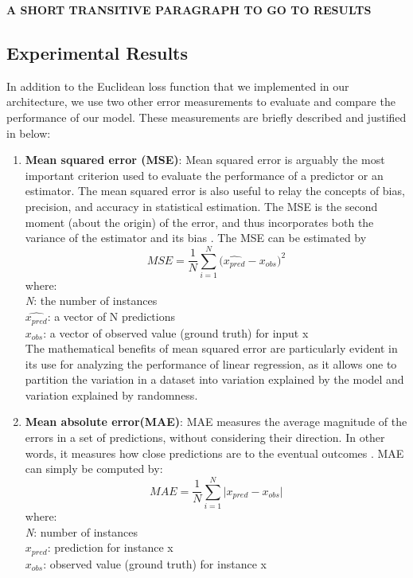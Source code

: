  

\textbf{A SHORT TRANSITIVE PARAGRAPH TO GO TO RESULTS}

\subsection{Experimental Results}

In addition to the Euclidean loss function that we implemented in our architecture, we use two other error measurements to evaluate and compare the performance of our model. These measurements are briefly described and justified in below:
\begin{enumerate}
\item \textbf{Mean squared error (MSE)}: Mean squared error is arguably the most important criterion used to evaluate the performance of a predictor or an estimator. The mean squared error is also useful to relay the concepts of bias, precision, and accuracy in statistical estimation. The MSE is the second moment (about the origin) of the error, and thus incorporates both the variance of the estimator and its bias \cite{lehmann1998theory}. The MSE can be estimated by
$$MSE = {\frac{1} {N}{\sum\limits_{i = 1}^N {(\hat{x_{pred}} - x_{obs} } })^{2} } $$
where:\\
\textit{N}: the number of instances\\
\textit{ $\hat{x_{pred}}$}: a vector of N predictions\\
\textit{$x_{obs}$}: a vector of observed value (ground truth) for input x\\

The mathematical benefits of mean squared error are particularly evident in its use for analyzing the performance of linear regression, as it allows one to partition the variation in a dataset into variation explained by the model and variation explained by randomness.
\item \textbf{Mean absolute error(MAE)}: MAE measures the average magnitude of the errors in a set of predictions, without considering their direction. In other words, it measures how close predictions are to the eventual outcomes \cite{willmott2005advantages}. MAE can simply be computed by:
$$MAE = {\frac{1} {N}{\sum\limits_{i = 1}^N {|x_{pred} - x_{obs} } }| } $$
where:\\
\textit{N}: number of instances\\
\textit{ $x_{pred}$}: prediction for instance x\\
\textit{$x_{obs}$}: observed value (ground truth) for instance x
\end{enumerate}

